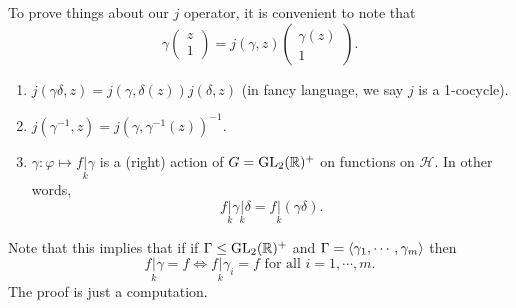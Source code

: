 \documentclass[a4paper]{article}
\renewcommand{\H}{\mathcal{H}}
\begin{document}
To prove things about our $j$ operator, it is convenient to note that
\[
  \gamma
  \begin{pmatrix}
    z\\1
  \end{pmatrix}
  = j(\gamma, z)
  \begin{pmatrix}
    \gamma(z)\\1
  \end{pmatrix}.\tag{$*$}
\]
\begin{prop}\leavevmode
  \begin{enumerate}
    \item $j(\gamma\delta, z) = j(\gamma, \delta(z)) j(\delta, z)$ (in fancy language, we say $j$ is a 1-cocycle).
    \item $j(\gamma^{-1}, z) = j (\gamma, \gamma^{-1}(z))^{-1}$.
    \item $\gamma: \varphi \mapsto f\underset{k}{|} \gamma$ is a (right) action of $G = \mathrm{GL}_2(\mathbb{R})^+$ on functions on $\H$. In other words,
      \[
        f\underset{k}{|} \gamma \underset{k}{|} \delta = f\underset{k}{|}(\gamma\delta).
      \]
  \end{enumerate}
\end{prop}
Note that this implies that if if $\Gamma \leq \mathrm{GL}_2(\mathbb{R})^+$ and $\Gamma = \langle \gamma_1, \cdots, \gamma_m\rangle$ then
\[
  f\underset{k}{|} \gamma = f\Longleftrightarrow f\underset{k}{|} \gamma_i = f\text{ for all }i = 1, \cdots, m.
\]
The proof is just a computation.
\end{document}
